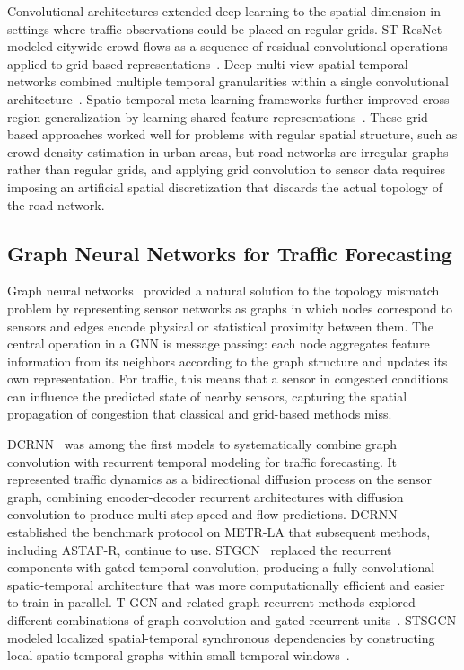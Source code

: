 \documentclass[fleqn,10pt]{wlscirep}
\begin{document}
Convolutional architectures extended deep learning to the spatial
dimension in settings where traffic observations could be placed on
regular grids. ST-ResNet modeled citywide crowd flows as a sequence
of residual convolutional operations applied to grid-based
representations~\cite{zhang2017deepst}. Deep multi-view spatial-temporal
networks combined multiple temporal granularities within a single
convolutional architecture~\cite{yao2018deepmulti}. Spatio-temporal
meta learning frameworks further improved cross-region generalization
by learning shared feature representations~\cite{pan2019stmeta}.
These grid-based approaches worked well for problems with regular
spatial structure, such as crowd density estimation in urban areas,
but road networks are irregular graphs rather than regular grids,
and applying grid convolution to sensor data requires imposing an
artificial spatial discretization that discards the actual topology
of the road network.

\subsection{Graph Neural Networks for Traffic Forecasting}

Graph neural networks~\cite{kipf2017gcn,velickovic2018gat} provided
a natural solution to the topology mismatch problem by representing
sensor networks as graphs in which nodes correspond to sensors and
edges encode physical or statistical proximity between them. The
central operation in a GNN is message passing: each node aggregates
feature information from its neighbors according to the graph
structure and updates its own representation. For traffic, this means
that a sensor in congested conditions can influence the predicted
state of nearby sensors, capturing the spatial propagation of
congestion that classical and grid-based methods miss.

DCRNN~\cite{li2018dcrnn} was among the first models to systematically
combine graph convolution with recurrent temporal modeling for traffic
forecasting. It represented traffic dynamics as a bidirectional
diffusion process on the sensor graph, combining encoder-decoder
recurrent architectures with diffusion convolution to produce
multi-step speed and flow predictions. DCRNN established the benchmark
protocol on METR-LA that subsequent methods, including ASTAF-R,
continue to use. STGCN~\cite{yu2018stgcn} replaced the recurrent
components with gated temporal convolution, producing a fully
convolutional spatio-temporal architecture that was more
computationally efficient and easier to train in parallel. T-GCN and
related graph recurrent methods explored different combinations of
graph convolution and gated recurrent
units~\cite{cui2020trafficgraph,li2018tgrnn}. STSGCN modeled
localized spatial-temporal synchronous dependencies by constructing
local spatio-temporal graphs within small temporal
windows~\cite{song2020stsgcn}.
\end{document}
